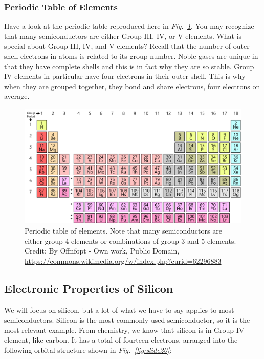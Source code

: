 \subsubsection{Periodic Table of Elements}
Have a look at the periodic table reproduced here in \emph{Fig.~\ref{fig:periodic_table}}.  You may recognize that many semiconductors are either Group III, IV, or V elements.  What is special about Group III, IV, and V elements?  Recall that the number of outer shell electrons in atoms is related to its group number.  Noble gases are unique in that they have complete shells and this is in fact why they are so stable.  Group IV elements in particular have four electrons in their outer shell.  This is why when they are grouped together, they bond and share electrons, four electrons on average.
\begin{figure}[H]
\centering
\includegraphics[width=.85\columnwidth]{periodic_table}
\caption{Periodic table of elements.  Note that many semiconductors are either group 4 elements or combinations of group 3 and 5 elements.  Credit:  By Offnfopt - Own work, Public Domain, \url{https://commons.wikimedia.org/w/index.php?curid=62296883}}
\label{fig:periodic_table}
\end{figure}
\subsection{Electronic Properties of Silicon}
We will focus on silicon, but a lot of what we have to say applies to most semiconductors.  Silicon is the most commonly used semiconductor, so it is the most relevant example.  From chemistry, we know that silicon is in Group IV element, like carbon.  It has a total of fourteen electrons, arranged into the following orbital structure shown in \emph{Fig.~\ref{fig:slide20}}:

